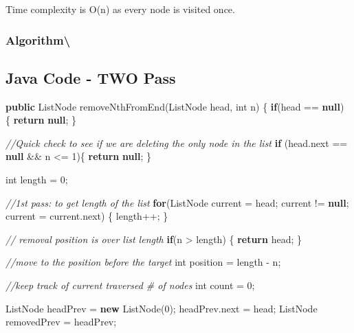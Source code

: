 \documentclass[]{book}
\newenvironment{Shaded}{\begin{snugshade}}{\end{snugshade}}
\newcommand{\CommentTok}[1]{\textcolor[rgb]{0.56,0.35,0.01}{\textit{#1}}}
\newcommand{\DataTypeTok}[1]{\textcolor[rgb]{0.13,0.29,0.53}{#1}}
\newcommand{\DecValTok}[1]{\textcolor[rgb]{0.00,0.00,0.81}{#1}}
\newcommand{\FunctionTok}[1]{\textcolor[rgb]{0.00,0.00,0.00}{#1}}
\newcommand{\KeywordTok}[1]{\textcolor[rgb]{0.13,0.29,0.53}{\textbf{#1}}}
\newcommand{\NormalTok}[1]{#1}
\begin{document}
Time complexity is O(n) as every node is visited once.

\hypertarget{algorithm-126}{%
\subsubsection{Algorithm\textbackslash{}}\label{algorithm-126}}

\hypertarget{java-code---two-pass}{%
\subsection{Java Code - TWO Pass}\label{java-code---two-pass}}

\begin{Shaded}
\begin{Highlighting}[]
\KeywordTok{public}\NormalTok{ ListNode }\FunctionTok{removeNthFromEnd}\NormalTok{(ListNode head, }\DataTypeTok{int}\NormalTok{ n) \{}
    \KeywordTok{if}\NormalTok{(head == }\KeywordTok{null}\NormalTok{) \{}
        \KeywordTok{return} \KeywordTok{null}\NormalTok{;}
\NormalTok{    \}}

    \CommentTok{//Quick check to see if we are deleting the only node in the list}
    \KeywordTok{if}\NormalTok{ (head.}\FunctionTok{next}\NormalTok{ == }\KeywordTok{null}\NormalTok{ && n <= }\DecValTok{1}\NormalTok{)\{}
        \KeywordTok{return} \KeywordTok{null}\NormalTok{;}
\NormalTok{    \}}

    \DataTypeTok{int}\NormalTok{ length = }\DecValTok{0}\NormalTok{;}

    \CommentTok{//1st pass: to get length of the list}
    \KeywordTok{for}\NormalTok{(ListNode current = head; current != }\KeywordTok{null}\NormalTok{; current = current.}\FunctionTok{next}\NormalTok{) \{}
\NormalTok{        length++;}
\NormalTok{    \}}

    \CommentTok{// removal position is over list length}
    \KeywordTok{if}\NormalTok{(n > length) \{}
        \KeywordTok{return}\NormalTok{ head;}
\NormalTok{    \}}

    \CommentTok{//move to the position before the target}
    \DataTypeTok{int}\NormalTok{ position = length - n;}

    \CommentTok{//keep track of current traversed # of nodes}
    \DataTypeTok{int}\NormalTok{ count = }\DecValTok{0}\NormalTok{;}

\NormalTok{    ListNode headPrev = }\KeywordTok{new} \FunctionTok{ListNode}\NormalTok{(}\DecValTok{0}\NormalTok{);}
\NormalTok{    headPrev.}\FunctionTok{next}\NormalTok{ = head;}
\NormalTok{    ListNode removedPrev = headPrev;}


\end{Highlighting}
\end{Shaded}
\end{document}
